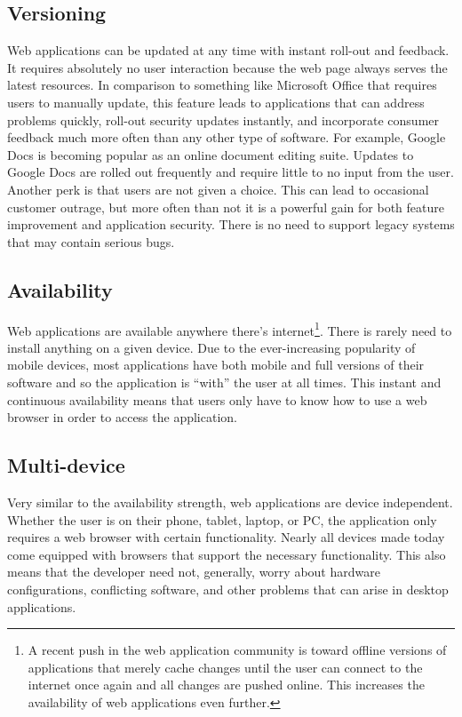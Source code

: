 \documentclass[12pt]{ucthesis}
\begin{document}
\subsection{Versioning}
Web applications can be updated at any time with instant roll-out and feedback. It requires absolutely no user interaction because the web page always serves the latest resources. In comparison to something like Microsoft Office that requires users to manually update, this feature leads to applications that can address problems quickly, roll-out security updates instantly, and incorporate consumer feedback much more often than any other type of software. For example, Google Docs is becoming popular as an online document editing suite. Updates to Google Docs are rolled out frequently and require little to no input from the user. Another perk is that users are not given a choice. This can lead to occasional customer outrage, but more often than not it is a powerful gain for both feature improvement and application security. There is no need to support legacy systems that may contain serious bugs.

\subsection{Availability}
Web applications are available anywhere there's internet\footnote{A recent push in the web application community is toward offline versions of applications that merely cache changes until the user can connect to the internet once again and all changes are pushed online. This increases the availability of web applications even further.}. There is rarely need to install anything on a given device. Due to the ever-increasing popularity of mobile devices, most applications have both mobile and full versions of their software and so the application is ``with'' the user at all times. This instant and continuous availability means that users only have to know how to use a web browser in order to access the application.

\subsection{Multi-device}
Very similar to the availability strength, web applications are device independent. Whether the user is on their phone, tablet, laptop, or PC, the application only requires a web browser with certain functionality. Nearly all devices made today come equipped with browsers that support the necessary functionality. This also means that the developer need not, generally, worry about hardware configurations, conflicting software, and other problems that can arise in desktop applications. 
\end{document}
